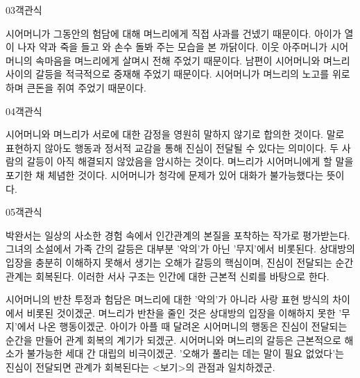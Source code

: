 \documentclass[fs85,seriesWit]{korfarm-base}
\begin{document}
\begin{kfQBlock}{03}{객관식}
\begin{kfChoices}
\kfChoice 시어머니가 그동안의 험담에 대해 며느리에게 직접 사과를 건넸기 때문이다.
\kfChoice 아이가 열이 나자 약과 죽을 들고 와 손수 돌봐 주는 모습을 본 까닭이다.
\kfChoice 이웃 아주머니가 시어머니의 속마음을 며느리에게 살며시 전해 주었기 때문이다.
\kfChoice 남편이 시어머니와 며느리 사이의 갈등을 적극적으로 중재해 주었기 때문이다.
\kfChoice 시어머니가 며느리의 노고를 위로하며 큰돈을 쥐여 주었기 때문이다.
\end{kfChoices}
\end{kfQBlock}

\begin{kfQBlock}{04}{객관식}
\begin{kfChoices}
\kfChoice 시어머니와 며느리가 서로에 대한 감정을 영원히 말하지 않기로 합의한 것이다.
\kfChoice 말로 표현하지 않아도 행동과 정서적 교감을 통해 진심이 전달될 수 있다는 의미이다.
\kfChoice 두 사람의 갈등이 아직 해결되지 않았음을 암시하는 것이다.
\kfChoice 며느리가 시어머니에게 할 말을 포기한 채 체념한 것이다.
\kfChoice 시어머니가 청각에 문제가 있어 대화가 불가능했다는 뜻이다.
\end{kfChoices}
\end{kfQBlock}

\begin{kfQBlock}{05}{객관식}
\begin{kfEvidence}박완서는 일상의 사소한 경험 속에서 인간관계의 본질을 포착하는 작가로 평가받는다. 그녀의 소설에서 가족 간의 갈등은 대부분 '악의'가 아닌 '무지'에서 비롯된다. 상대방의 입장을 충분히 이해하지 못해서 생기는 오해가 갈등의 핵심이며, 진심이 전달되는 순간 관계는 회복된다. 이러한 서사 구조는 인간에 대한 근본적 신뢰를 바탕으로 한다.\end{kfEvidence}
\begin{kfChoices}
\kfChoice 시어머니의 반찬 투정과 험담은 며느리에 대한 '악의'가 아니라 사랑 표현 방식의 차이에서 비롯된 것이겠군.
\kfChoice 며느리가 반찬을 줄인 것은 상대방의 입장을 이해하지 못한 '무지'에서 나온 행동이겠군.
\kfChoice 아이가 아플 때 달려온 시어머니의 행동은 진심이 전달되는 순간을 만들어 관계 회복의 계기가 되겠군.
\kfChoice 시어머니와 며느리의 갈등은 근본적으로 해소가 불가능한 세대 간 대립의 비극이겠군.
\kfChoice '오해가 풀리는 데는 말이 필요 없었다'는 진심이 전달되면 관계가 회복된다는 <보기>의 관점과 일치하겠군.
\end{kfChoices}
\end{kfQBlock}
\end{document}
